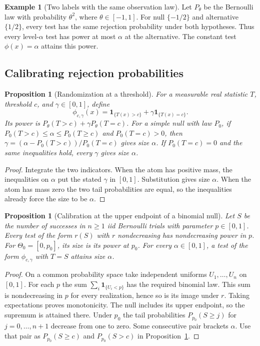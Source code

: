 \documentclass[11pt,oneside]{book}
\newtheorem{proposition}[theorem]{Proposition}
\theoremstyle{definition}
\newtheorem{example}[theorem]{Example}
\theoremstyle{remark}
\begin{document}
\begin{example}[Two labels with the same observation law]
\label{ex:test-bernoulli-aliased}
Let $P_\theta$ be the Bernoulli law with probability $\theta^2$,
where $\theta\in[-1,1]$. For null $\{-1/2\}$ and alternative
$\{1/2\}$, every test has the same rejection probability under
both hypotheses. Thus every level-$\alpha$ test has power at
most $\alpha$ at the alternative. The constant test
$\phi(x)=\alpha$ attains this power.
\end{example}

\subsection{Calibrating rejection probabilities}
\label{subsec:test-calibration}

\begin{proposition}[Randomization at a threshold]
\label{prop:test-threshold-randomization}
For a measurable real statistic $T$, threshold $c$, and
$\gamma\in[0,1]$, define
\[
\phi_{c,\gamma}(x)=\mathbf 1_{\{T(x)>c\}}
+\gamma\mathbf 1_{\{T(x)=c\}} .
\]
Its power is $P_\theta(T>c)+\gamma P_\theta(T=c)$.
For a simple null with law $P_0$, if
$P_0(T>c)\leq\alpha\leq P_0(T\geq c)$ and $P_0(T=c)>0$, then
$\gamma=(\alpha-P_0(T>c))/P_0(T=c)$ gives size $\alpha$.
If $P_0(T=c)=0$ and the same inequalities hold, every $\gamma$
gives size $\alpha$.
\end{proposition}
\begin{proof}
Integrate the two indicators. When the atom has positive mass,
the inequalities on $\alpha$ put the stated $\gamma$ in $[0,1]$.
Substitution gives size $\alpha$. When the atom has mass zero
the two tail probabilities are equal, so the inequalities already
force the size to be $\alpha$.
\end{proof}

\begin{proposition}[Calibration at the upper endpoint of a binomial null]
\label{prop:test-binomial-composite-calibration}
Let $S$ be the number of successes in $n\geq1$ iid Bernoulli
trials with parameter $p\in[0,1]$. Every test of the form $r(S)$
with $r$ nondecreasing has nondecreasing power in $p$.
For $\Theta_0=[0,p_0]$, its size is its power at $p_0$.
For every $\alpha\in[0,1]$, a test of the form $\phi_{c,\gamma}$
with $T=S$ attains size $\alpha$.
\end{proposition}
\begin{proof}
On a common probability space take independent uniforms
$U_1,\ldots,U_n$ on $[0,1]$. For each $p$ the sum
$\sum_i\mathbf 1_{\{U_i<p\}}$ has the required binomial law.
This sum is nondecreasing in $p$ for every realization, hence so is
its image under $r$. Taking expectations proves monotonicity.
The null includes its upper endpoint, so the supremum is attained
there. Under $p_0$ the tail probabilities $P_{p_0}(S\geq j)$ for
$j=0,\ldots,n+1$ decrease from one to zero. Some consecutive pair
brackets $\alpha$. Use that pair as $P_{p_0}(S\geq c)$ and
$P_{p_0}(S>c)$ in Proposition~\ref{prop:test-threshold-randomization}.
\end{proof}
\end{document}
